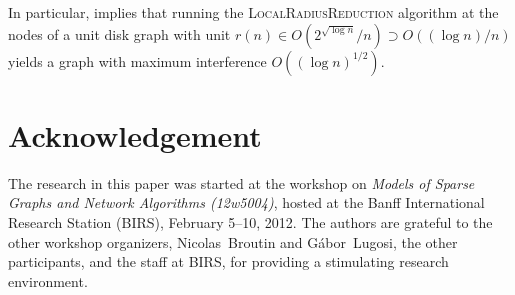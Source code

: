 \documentclass{patmorin}
\begin{document}
In particular,  implies that running the
\textsc{LocalRadiusReduction} algorithm at the nodes of a unit disk
graph with unit $r(n)\in O(2^{\sqrt{\log n}}/n)\supset O((\log n)/n)$
yields a graph with maximum interference $O((\log n)^{1/2})$.


\section*{Acknowledgement}

The research in this paper was started at the workshop on \emph{Models
of Sparse Graphs and Network Algorithms (12w5004)}, hosted at the Banff
International Research Station (BIRS), February 5--10, 2012.  The authors
are grateful to the other workshop organizers, Nicolas~Broutin and
G\'abor~Lugosi, the other participants, and the staff at BIRS, for
providing a stimulating research environment.



\end{document}
